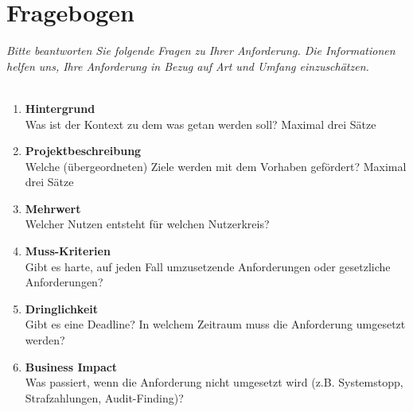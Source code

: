 \section{Fragebogen}
\textit{Bitte beantworten Sie folgende Fragen zu Ihrer Anforderung. Die Informationen helfen uns, Ihre Anforderung in Bezug auf Art und Umfang einzuschätzen. \\ \\
}

\begin{Form}
  \begin{enumerate}
  	\item \textbf{Hintergrund} \\
  	Was ist der Kontext zu dem was getan werden soll? Maximal drei Sätze \\
  	\TextField[multiline, name=background,width=0.9\textwidth,  height=2cm, value={} ]{}
  	
  	\item \textbf{Projektbeschreibung} \\
  	Welche (übergeordneten) Ziele werden mit dem Vorhaben gefördert? Maximal drei Sätze  \\
  	\TextField[multiline, name=goal,width=0.9\textwidth,  height=2cm, value={}]{}
  	
  	\item \textbf{Mehrwert} \\
  	Welcher Nutzen entsteht für welchen Nutzerkreis? \\
  	\TextField[multiline, name=value,width=0.9\textwidth,  height=2cm, value={} ]{}
  	
  	\item \textbf{Muss-Kriterien} \\
  	Gibt es harte, auf jeden Fall umzusetzende Anforderungen oder gesetzliche Anforderungen?   \\
  	\TextField[multiline, name=must,width=0.9\textwidth,  height=2cm, value={} ]{}
  	
  	\item \textbf{Dringlichkeit } \\
  Gibt es eine Deadline? In welchem Zeitraum muss die Anforderung umgesetzt werden? \\
  	\TextField[multiline, name=priority,width=0.9\textwidth,  height=2cm, value={} ]{}
  	\newpage
  	\item \textbf{Business Impact} \\
  	Was passiert, wenn die Anforderung nicht umgesetzt wird (z.B. Systemstopp, Strafzahlungen, Audit-Finding)?   \\
  	\TextField[multiline, name=business,width=0.9\textwidth,  height=2cm, value={}]{}
  	

\end{enumerate}
\end{Form}
